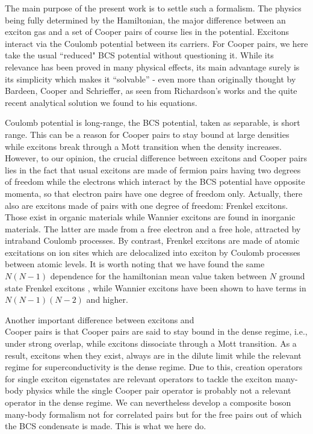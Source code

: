 \documentclass[epj]{svjour}
\begin{document}
The main purpose of the present work is to settle such a formalism. The physics being fully determined by the Hamiltonian, the major difference between an exciton gas and a set of Cooper pairs of course lies in the potential. Excitons interact via the Coulomb potential between its carriers. For Cooper pairs, we here take the usual ``reduced" BCS potential without questioning it. While its relevance has been proved in many physical effects, its main advantage surely is its simplicity which makes it ``solvable'' - even more than originally thought by Bardeen, Cooper and Schrieffer, as seen from Richardson's works and the quite recent analytical solution we found to his equations.
 
  Coulomb potential is long-range, the BCS potential, taken as separable, is short range. This can be a reason for Cooper pairs to stay bound at large densities while excitons break through a Mott transition when the density increases. However, to our opinion, the crucial difference between excitons and Cooper pairs lies in the fact that usual excitons  are made of fermion pairs having two degrees of freedom while the electrons which interact by the BCS potential have opposite momenta, so that electron pairs have one degree of freedom only.  Actually, there also are excitons made of pairs with one degree of freedom: Frenkel excitons. Those exist in organic materials while Wannier excitons are found in inorganic materials. The latter are made from a free electron and a free hole, attracted by intraband Coulomb processes. By contrast, Frenkel excitons are made of atomic excitations on ion sites which are delocalized into exciton by Coulomb processes between atomic levels.  It is worth noting that we have found the same  $N(N-1)$ dependence for the hamiltonian mean value taken between $N$ ground state Frenkel excitons \cite{frenkel}, while Wannier excitons have been shown to have terms in $N(N-1)(N-2)$ and higher\cite{monicOdil}.




 Another important difference between excitons and \\Cooper pairs is that Cooper pairs are said to stay bound in the dense regime, i.e., under strong overlap, while excitons dissociate through a Mott transition. As a result, excitons when they exist, always are in the dilute limit while the relevant regime for superconductivity is the dense regime. Due to this, creation operators for single exciton eigenstates are relevant operators to tackle the exciton many-body physics while the single Cooper pair operator is probably not a relevant operator in the dense regime. We can nevertheless develop a composite boson many-body formalism not for correlated pairs but for the free pairs out of which the BCS condensate is made. This is what we here do.
\end{document}
